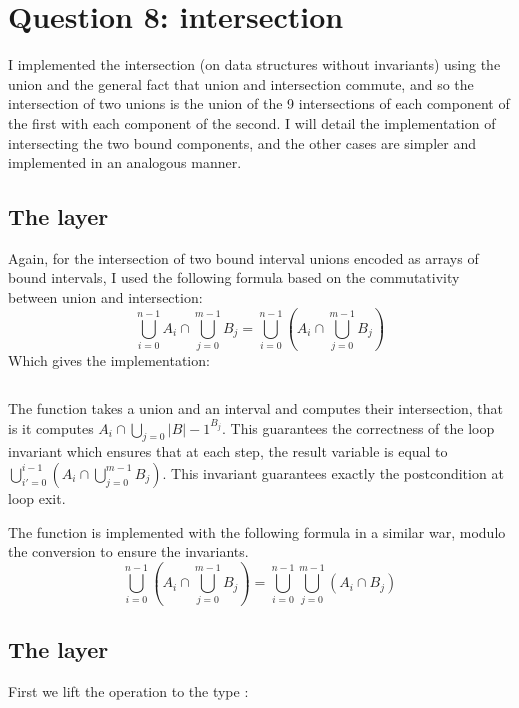 \section{Question 8: intersection}

I implemented the intersection (on data structures without invariants)
using the union and the general fact that union and intersection commute, and so the
intersection of two unions is the union of the 9 intersections of each component of
the first with each component of the second.
%
I will detail the implementation of intersecting the two bound components, and the
other cases are simpler and implemented in an analogous manner.

\subsection{The  layer}

Again, for the intersection of two bound interval unions encoded as arrays of bound
intervals, I used the following formula based on the commutativity between union
and intersection:
%
$$
\bigcup_{i=0}^{n-1}{A_i} \cap \bigcup_{j=0}^{m-1}{B_j}
=
\bigcup_{i=0}^{n-1}{\left( A_i \cap \bigcup_{j=0}^{m-1}{B_j}\right)}
$$
%
Which gives the implementation: \inputminted{\whyml}{why3code/inter_union.mlw} The
function  takes a union and an interval and computes their
intersection, that is it computes $A_i \cap \bigcup_{j=0}{|B|-1}^{B_j}$. This
guarantees the correctness of the loop invariant which ensures that at each step, the
result variable is equal to
%
$\bigcup_{i'=0}^{i-1}{\left( A_i \cap \bigcup_{j=0}^{m-1}{B_j}\right)}$.
%
This invariant guarantees exactly the postcondition at loop exit.

The  function is implemented with the following formula in a
similar war, modulo the conversion to ensure the  invariants.
$$
\bigcup_{i=0}^{n-1}{\left( A_i \cap \bigcup_{j=0}^{m-1}{B_j}\right)}
=
\bigcup_{i=0}^{n-1}{\bigcup_{j=0}^{m-1}{\left(A_i \cap B_j\right)}}
$$

\subsection{The  layer}

First we lift the operation  to the type :
\inputminted{\whyml}{why3code/inter_bound_bound.mlw}

